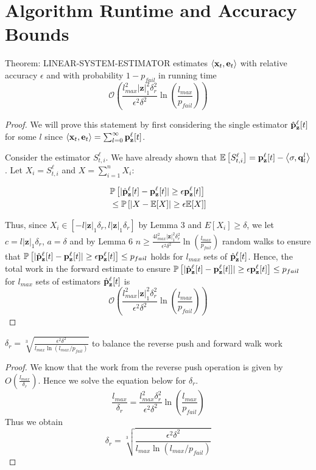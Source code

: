 
\section{Algorithm Runtime and Accuracy Bounds}

\begin{theorem}
Theorem: LINEAR-SYSTEM-ESTIMATOR estimates $\left< \mathbf{x}_t, \mathbf{e}_t \right>$ with relative accuracy $\epsilon$ and with probability $1-p_{fail}$ in running time 
$$\mathcal{O}\left(\frac{l_{max}^2 |\mathbf{z}|_1^2 \delta_r^2}{\epsilon^2\delta^2}\ln \left(\frac{l_{max}}{p_{fail}}\right)\right)$$
\end{theorem}

\begin{proof}
We will prove this statement by first considering the single estimator $\hat{\mathbf{p}}_\mathbf{z}^{\ell}[t]$ for some $l$ since $\left< \mathbf{x}_t, \mathbf{e}_t \right> = \sum_{l=0}^{\infty} {\mathbf{p}}_\mathbf{z}^{\ell}[t]$.

Consider the estimator $S_{t, i}^{\ell}$. We have already shown that ${\mathbb{E}}\left[S_{t, i}^{\ell}\right] = {\mathbf{p}}_\mathbf{z}^{\ell}[t] - \left< \sigma, \mathbf{q}^{l}_t \right>$. 
Let $X_i = S_{t, i}^{\ell}$ and $X = \sum_{i=1}^n X_i$:

\begin{align*}
&\mathbb{P}\left[ | \hat{\mathbf{p}}_\mathbf{z}^{\ell}[t] - {\mathbf{p}}_\mathbf{z}^{\ell}[t]| \geq  \epsilon {\mathbf{p}}_\mathbf{z}^{\ell}[t] \right] \\
&\leq \mathbb{P}\left[ |X -\mathbb{E}[X]| \geq \epsilon \mathbb{E}[X]\right] 
\end{align*}

Thus, since $X_i \in [-l|\mathbf{z}|_1\delta_r, l|\mathbf{z}|_1\delta_r]$ by Lemma 3 and $E[X_i] \geq \delta$, we let $c = l|\mathbf{z}|_1\delta_r$, $a = \delta$ and by Lemma 6
 $n \geq \frac{4l_{max}^2|\mathbf{z}|_1^2 \delta_r^2}{\epsilon^2\delta^2}\ln \left(\frac{l_{max}}{p_{fail}}\right)$ random walks to ensure that $\mathbb{P}\left[ | \hat{\mathbf{p}}_\mathbf{z}^{\ell}[t]  -  {\mathbf{p}}_\mathbf{z}^{\ell}[t]|  \geq  \epsilon  {\mathbf{p}}_\mathbf{z}^{\ell}[t] \right] \leq p_{fail}$ holds for $l_{max}$ sets of $\hat{\mathbf{p}}_\mathbf{z}^{\ell}[t]$.
Hence, the total work in the forward estimate to ensure 
$\mathbb{P}\left[ | \hat{\mathbf{p}}_\mathbf{z}^{\ell}[t]  -  {\mathbf{p}}_\mathbf{z}^{\ell}[t]]|  \geq  \epsilon  {\mathbf{p}}_\mathbf{z}^{\ell}[t] \right] \leq p_{fail}$ for $l_{max}$ sets of estimators $\hat{\mathbf{p}}_\mathbf{z}^{\ell}[t]$ is
$$\mathcal{O}\left(\frac{l_{max}^2 |\mathbf{z}|_1^2 \delta_r^2}{\epsilon^2\delta^2}\ln \left(\frac{l_{max}}{p_{fail}}\right)\right)$$
\end{proof}

\begin{lemma}
$\delta_r =\sqrt[3]{\frac{\epsilon^2\delta^2}{l_{max}\ln(l_{max}/p_{fail}) } } $ to balance the reverse push and forward walk work
\end{lemma}
\begin{proof}
We know that the work from the reverse push operation is given by $O\left(\frac{l_{max}}{\delta_r}\right)$.
Hence we solve the equation below for $\delta_r$.
\[\frac{l_{max}}{\delta_r} = \frac{l_{max}^2 \delta_r^2}{\epsilon^2\delta^2}\ln \left(\frac{l_{max}}{p_{fail}}\right) \]
Thus we obtain
\begin{equation*}
\delta_r = \sqrt[3]{\frac{\epsilon^2\delta^2}{l_{max}\ln(l_{max}/p_{fail}) } }    
\end{equation*}
\end{proof}



